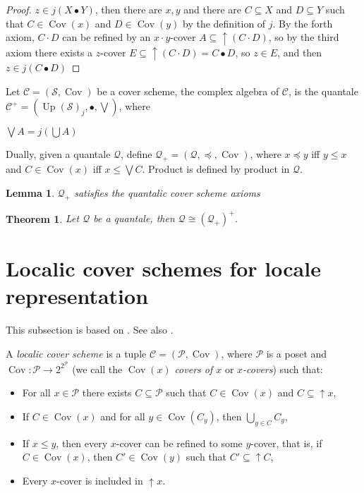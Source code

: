 \documentclass[a4paper]{article}
\theoremstyle{defin}
\theoremstyle{theorem}
\newtheorem{theorem}{Theorem}
\theoremstyle{claim}
\theoremstyle{prop}
\theoremstyle{lemma}
\newtheorem{lemma}{Lemma}
\theoremstyle{fact}
\theoremstyle{ex}
\theoremstyle{col}
\begin{document}
\begin{proof}
$z \in j (X \bullet Y)$, then there are $x, y$ and there are $C \subseteq X$ and $D \subseteq Y$ such that $C \in \operatorname{Cov}(x)$ and $D \in \operatorname{Cov}(y)$ by the definition of $j$. By the forth axiom, $C \cdot D$ can be refined by an $x \cdot y$-cover $A \subseteq \uparrow (C \cdot D)$, so by the third axiom there exists a $z$-cover $E \subseteq \uparrow (C \cdot D) = C \bullet D$, so $z \in E$, and then $z \in j (C \bullet D)$
\end{proof}

Let $\mathcal{C} = (\mathcal{S}, \operatorname{Cov})$ be a cover scheme, the complex algebra of $\mathcal{C}$, is the quantale $\mathcal{C}^{+} = (\operatorname{Up}(\mathcal{S})_j, \bullet, \bigvee)$, where
\begin{center}
$\bigvee A = j (\bigcup A)$
\end{center}

Dually, given a quantale $\mathcal{Q}$, define $\mathcal{Q}_+ = (\mathcal{Q}, \preceq, \operatorname{Cov})$, where
$x \preceq y$ iff $y \leq x$ and $C \in \operatorname{Cov}(x)$ iff $x \leq \bigvee C$. Product is defined by product in $\mathcal{Q}$.

\begin{lemma}
$\mathcal{Q}_+$ satisfies the quantalic cover scheme axioms
\end{lemma}

\begin{theorem}
Let $\mathcal{Q}$ be a quantale, then $\mathcal{Q} \cong (\mathcal{Q}_+)^+$.
\end{theorem}

\section{Localic cover schemes for locale representation}

This subsection is based on \cite{goldblatt2011cover}. See also \cite{Bell2003CoverSF}.

A \emph{localic cover scheme} is a tuple $\mathcal{C} = (\mathcal{P}, \operatorname{Cov})$, where $\mathcal{P}$ is a poset and $\operatorname{Cov} : \mathcal{P} \to 2^{2^{\mathcal{P}}}$ (we call the $\operatorname{Cov}(x)$ \emph{covers of $x$} or \emph{$x$-covers}) such that:
\begin{itemize}
\item For all $x \in \mathcal{P}$ there exists $C \subseteq \mathcal{P}$ such that $C \in \operatorname{Cov}(x)$ and $C \subseteq \uparrow x$,
\item If $C \in \operatorname{Cov}(x)$ and for all $y \in \operatorname{Cov}(C_y)$, then $\bigcup \limits_{y \in C} C_y$,
\item If $x \leq y$, then every $x$-cover can be refined to some $y$-cover, that is, if $C \in \operatorname{Cov}(x)$, then $C' \in \operatorname{Cov}(y)$ such that $C' \subseteq \uparrow C$,
\item Every $x$-cover is included in $\uparrow x$.
\end{itemize}
\end{document}
